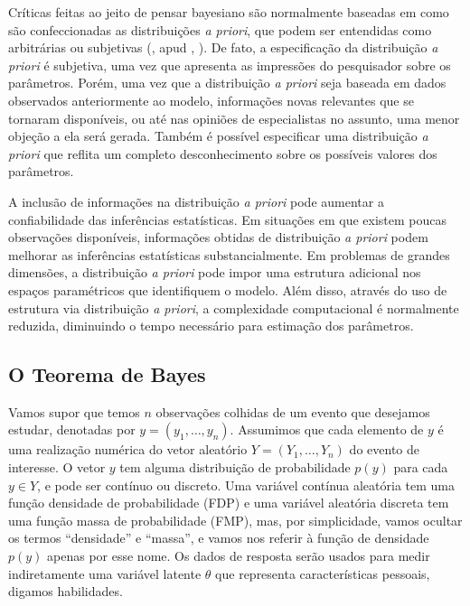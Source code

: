 \documentclass[
	12pt,				%
	openright,			%
	twoside,			%
	a4paper,			%
	english,			%
	brazil				%
	]{abntex2}
\begin{document}
 Críticas feitas ao jeito de pensar bayesiano são normalmente baseadas em como são confeccionadas as distribuições \emph{a priori}, que podem ser entendidas como arbitrárias ou subjetivas (, \citeyear{gelman2008} apud , \citeyear{fox2010}). De fato, a especificação da distribuição \emph{a priori} é subjetiva, uma vez que apresenta as impressões do pesquisador sobre os parâmetros. Porém, uma vez que a distribuição \emph{a priori} seja baseada em dados observados anteriormente ao modelo, informações novas relevantes que se tornaram disponíveis, ou até nas opiniões de especialistas no assunto, uma menor objeção a ela será gerada. Também é possível especificar uma distribuição \emph{a priori} que reflita um completo desconhecimento sobre os possíveis valores dos parâmetros.

 A inclusão de informações na distribuição \emph{a priori} pode aumentar a confiabilidade das inferências estatísticas. Em situações em que existem poucas observações disponíveis, informações obtidas de distribuição \emph{a priori} podem melhorar as inferências estatísticas substancialmente. Em problemas de grandes dimensões, a distribuição \emph{a priori} pode impor uma estrutura adicional nos espaços paramétricos que identifiquem o modelo. Além disso, através do uso de estrutura via distribuição \emph{a priori}, a complexidade computacional é normalmente reduzida, diminuindo o tempo necessário para estimação dos parâmetros.
 
 \subsection{O Teorema de Bayes}
 Vamos supor que temos $n$ observações colhidas de um evento que desejamos estudar, denotadas por $y = (y_{1}, …, y_{n})$. Assumimos que cada elemento de $y$ é uma realização numérica do vetor aleatório $Y = (Y_{1}, …, Y_{n})$ do evento de interesse. O vetor $y$ tem alguma distribuição de probabilidade $p(y)$ para cada $y \in Y$, e pode ser contínuo ou discreto. Uma variável contínua aleatória tem uma função densidade de probabilidade (FDP) e uma variável aleatória discreta tem uma função massa de probabilidade (FMP), mas, por simplicidade, vamos ocultar os termos ``densidade'' e ``massa'', e vamos nos referir à função de densidade $p(y)$ apenas por esse nome. Os dados de resposta serão usados para medir indiretamente uma variável latente $\theta$ que representa características pessoais, digamos habilidades.
 
\end{document}

